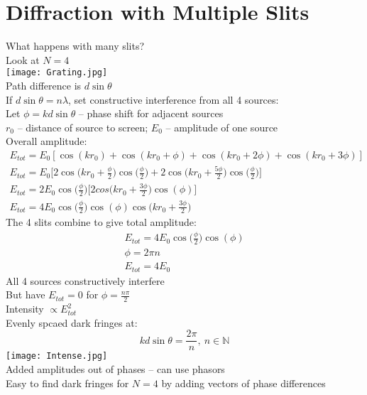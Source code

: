 \documentclass[a4paper, 11pt, fleqn, normalem]{report}
\begin{document}
\section{Diffraction with Multiple Slits}
What happens with many slits? \\
Look at $N = 4$ \\
\texttt{[image: Grating.jpg]} \\
Path difference is $d\sin{\theta}$ \\
If $d\sin{\theta} = n\lambda$, set constructive interference from all 4 sources: \\
Let $\phi = kd\sin{\theta}$ -- phase shift for adjacent sources \\
$r_{0}$ -- distance of source to screen; $E_{0}$ -- amplitude of one source \\
Overall amplitude:
\begin{gather*}
    E_{tot} = E_{0}[\cos{(kr_{0})} + \cos{(kr_{0} + \phi)} + \cos{(kr_{0} + 2\phi)} + \cos{(kr_{0} + 3\phi)}] \\
    E_{tot} = E_{0}\bigg[2\cos{\big(kr_{0} + \tfrac{\phi}{2}\big)}\cos{\big(\tfrac{\phi}{2}\big)} + 2\cos{\big(kr_{0} + \tfrac{5\phi}{2}\big)}\cos{\big(\tfrac{\phi}{2}\big)}\bigg] \\
    E_{tot} = 2E_{0}\cos{\big(\tfrac{\phi}{2}\big)}\bigg[2cos{\big(kr_{0} + \tfrac{3\phi}{2}\big)}\cos{(\phi)}\bigg] \\
    E_{tot} = 4E_{0}\cos{\big(\tfrac{\phi}{2}\big)}\cos{(\phi)}\cos{\big(kr_{0} + \tfrac{3\phi}{2}\big)}
\end{gather*}
The 4 slits combine to give total amplitude:
\begin{gather*}
    E_{tot} = 4E_{0}\cos{\big(\tfrac{\phi}{2}\big)}\cos{(\phi)} \\
    \phi = 2\pi n \\
    E_{tot} = 4E_{0}
\end{gather*}
All 4 sources constructively interfere \\
But have $E_{tot} = 0$ for $\phi = \frac{n\pi}{2}$ \\
Intensity $\propto E_{tot}^{2}$ \\
Evenly spcaed dark fringes at:
\begin{equation*}
    kd\sin{\theta} = \frac{2\pi}{n},~n \in \mathbb{N}
\end{equation*}
\texttt{[image: Intense.jpg]} \\
Added amplitudes out of phases -- can use phasors \\
Easy to find dark fringes for $N = 4$ by adding vectors of phase differences \\
\end{document}
